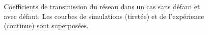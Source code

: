 \begin{figure}[!h]
	\centering
	\caption{\label{ref_trans1} Coefficients de transmission du réseau dans un cas sans défaut et avec défaut. Les courbes de simulations (tiretée) et de l’expérience (continue) sont superposées.}
\end{figure}

